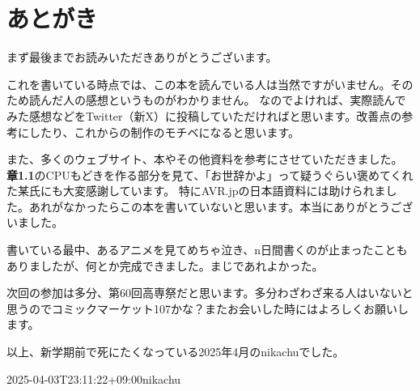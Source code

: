 \documentclass[main.tex]{subfiles}
\begin{document}
\chapter*{あとがき}

まず最後までお読みいただきありがとうございます。

これを書いている時点では、この本を読んでいる人は当然ですがいません。そのため読んだ人の感想というものがわかりません。
なのでよければ、実際読んでみた感想などをTwitter（新X）に投稿していただければと思います。改善点の参考にしたり、これからの制作のモチベになると思います。

また、多くのウェブサイト、本やその他資料を参考にさせていただきました。
{\bfseries\mybookmaincolor 章1.1}のCPUもどきを作る部分を見て、「お世辞かよ」って疑うぐらい褒めてくれた某氏にも大変感謝しています。
特にAVR.jpの日本語資料には助けられました。あれがなかったらこの本を書いていないと思います。本当にありがとうございました。

書いている最中、あるアニメを見てめちゃ泣き、n日間書くのが止まったこともありましたが、何とか完成できました。まじであれよかった。

次回の参加は多分、第60回高専祭だと思います。多分わざわざ来る人はいないと思うのでコミックマーケット107かな？またお会いした時にはよろしくお願いします。

以上、新学期前で死にたくなっている2025年4月のnikachuでした。

\begin{flushright}
    2025-04-03T23:11:22+09:00\;\;nikachu
\end{flushright}


\end{document}

